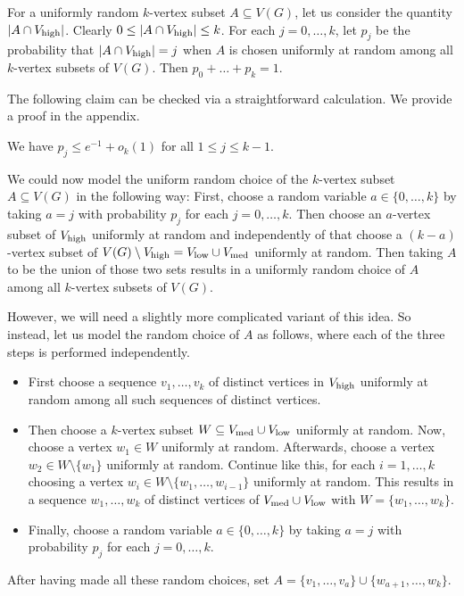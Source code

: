 For a uniformly random $k$-vertex subset $A\subseteq V(G)$, let us consider the quantity $\vert A\cap V_{\textnormal{high}}\vert$. Clearly $0\leq \vert A\cap V_{\textnormal{high}}\vert\leq k$. For each $j=0,\dots,k$, let $p_j$ be the probability that $\vert A\cap V_{\textnormal{high}}\vert=j$ when $A$ is chosen uniformly at random among all $k$-vertex subsets of $V(G)$. Then $p_0+\dots+p_k=1$.

The following claim can be checked via a straightforward calculation. We provide a proof in the appendix.

\begin{claim}\label{claim-p-j-1-e}
We have $p_j\leq e^{-1}+o_k(1)$ for all $1\leq j\leq k-1$.
\end{claim}


We could now model the uniform random choice of the $k$-vertex subset $A\subseteq V(G)$ in the following way: First, choose a random variable $a\in \lbrace 0,\dots,k\rbrace$ by taking $a=j$ with probability $p_j$ for each $j=0,\dots,k$. Then choose an $a$-vertex subset of $V_{\textnormal{high}}$ uniformly at random and independently of that choose a $(k-a)$-vertex subset of $V(G)\setminus V_{\textnormal{high}}=V_{\textnormal{low}}\cup V_{\textnormal{med}}$ uniformly at random. Then taking $A$ to be the union of those two sets results in a uniformly random choice of $A$ among all $k$-vertex subsets of $V(G)$.

However, we will need a slightly more complicated variant of this idea. So instead, let us model the random choice of $A$ as follows, where each of the three steps is performed independently.
\begin{itemize}
\item First choose a sequence $v_1,\dots,v_k$ of distinct vertices in $V_{\textnormal{high}}$ uniformly at random among all such sequences of distinct vertices.
\item Then choose a $k$-vertex subset $W\subseteq V_{\textnormal{med}}\cup V_{\textnormal{low}}$ uniformly at random. Now, choose a vertex $w_1\in W$ uniformly at random. Afterwards, choose a vertex $w_2\in W\setminus \lbrace w_1\rbrace$ uniformly at random. Continue like this, for each $i=1,\dots,k$ choosing a vertex $w_i\in W\setminus \lbrace w_1,\dots,w_{i-1}\rbrace$ uniformly at random. This results in a sequence $w_1,\dots,w_k$ of distinct vertices of $V_{\textnormal{med}}\cup V_{\textnormal{low}}$ with $W=
\lbrace w_1,\dots,w_k\rbrace$.
\item Finally, choose a random variable $a\in \lbrace 0,\dots,k\rbrace$ by taking $a=j$ with probability $p_j$ for each $j=0,\dots,k$.
\end{itemize}
After having made all these random choices, set $A=\lbrace v_1,\dots,v_a\rbrace\cup \lbrace w_{a+1},\dots,w_k\rbrace$.

